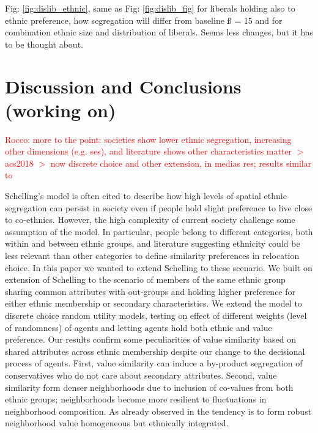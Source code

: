 \documentclass[
]{article}
\begin{document}
Fig: \ref{fig:dislib_ethnic}, same as Fig: \ref{fig:dislib_fig} for
liberals holding also to ethnic preference, how segregation will differ
from baseline ß = 15 and for combination ethnic size and distribution of
liberals. Seems less changes, but it has to be thought about.

\hypertarget{discussion-and-conclusions-working-on}{%
\section{Discussion and Conclusions (working
on)}\label{discussion-and-conclusions-working-on}}

{\textcolor{red}{Rocco: more to the point: societies show lower ethnic segregation, increasing other dimensions (e.g. ses), and literature shows other characteristics matter $>$ acs2018 $>$ now discrete choice and other extension, in medias res; results similar to \cite{paolillo2018}}}

Schelling's model is often cited to describe how high levels of spatial
ethnic segregation can persist in society even if people hold slight
preference to live close to co-ethnics. However, the high complexity of
current society challenge some assumption of the model. In particular,
people belong to different categories, both within and between ethnic
groups, and literature suggesting ethnicity could be less relevant than
other categories to define similarity preferences in relocation choice.
In this paper we wanted to extend Schelling to these scenario. We built
on \cite{paolillo2018} extension of Schelling to the scenario of members
of the same ethnic group sharing common attributes with out-groups and
holding higher preference for either ethnic membership or secondary
characteristics. We extend the model to discrete choice random utility
models, testing on effect of different weights (level of randomness) of
agents and letting agents hold both ethnic and value preference. Our
results confirm some peculiarities of value similarity based on shared
attributes across ethnic membership despite our change to the decisional
process of agents. First, value similarity can induce a by-product
segregation of conservatives who do not care about secondary attributes.
Second, value similarity form denser neighborhoods due to inclusion of
co-values from both ethnic groups; neighborhoods become more resilient
to fluctuations in neighborhood composition. As already observed in
\cite{paolillo2018} the tendency is to form robust neighborhood value
homogeneous but ethnically integrated.
\end{document}
